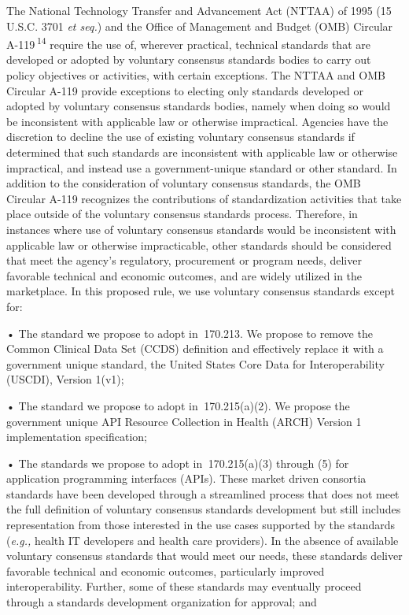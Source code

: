 \documentclass[twoside,11pt]{article}
\begin{document}
          The National Technology Transfer and Advancement Act (NTTAA) of 1995 (15 U.S.C. 3701 \emph{et seq.}) and the Office of Management and Budget (OMB) Circular A-119 \textsuperscript{14}
             require the use of, wherever practical, technical standards that are developed or adopted by voluntary consensus standards bodies to carry out policy objectives or activities, with certain exceptions. The NTTAA and OMB Circular A-119 provide exceptions to electing only standards developed or adopted by voluntary consensus standards bodies, namely when doing so would be inconsistent with applicable law or otherwise impractical. Agencies have the discretion to decline the use of existing voluntary consensus standards if determined that such standards are inconsistent with applicable law or otherwise impractical, and instead use a government-unique standard or other standard. In addition to the consideration of voluntary consensus standards, the OMB Circular A-119 recognizes the contributions of standardization activities that take place outside of the voluntary consensus standards process. Therefore, in instances where use of voluntary consensus standards would be inconsistent with applicable law or otherwise impracticable, other standards should be considered that meet the agency's regulatory, procurement or program needs, deliver favorable technical and economic outcomes, and are widely utilized in the marketplace. In this proposed rule, we use voluntary consensus standards except for:




          
          

            • The standard we propose to adopt in \textsection{} 170.213. We propose to remove the Common Clinical Data Set (CCDS) definition and effectively replace it with a government  \ifhmode\expandafter\xspace\fi unique standard, the United States Core Data for Interoperability (USCDI), Version 1(v1);


            • The standard we propose to adopt in \textsection{} 170.215(a)(2). We propose the government unique API Resource Collection in Health (ARCH) Version 1 implementation specification;



            • The standards we propose to adopt in \textsection{} 170.215(a)(3) through (5) for application programming interfaces (APIs). These market driven consortia standards have been developed through a streamlined process that does not meet the full definition of voluntary consensus standards development but still includes representation from those interested in the use cases supported by the standards (\emph{e.g.,} health IT developers and health care providers). In the absence of available voluntary consensus standards that would meet our needs, these standards deliver favorable technical and economic outcomes, particularly improved interoperability. Further, some of these standards may eventually proceed through a standards development organization for approval; and
\end{document}
